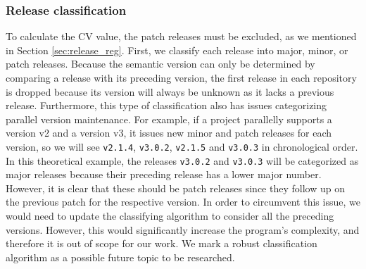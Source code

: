 \subsubsection{Release classification}

To calculate the CV value, the patch releases must be excluded, as we mentioned in Section \ref{sec:release_reg}. First, we classify each release into major, minor, or patch releases. Because the semantic version can only be determined by comparing a release with its preceding version, the first release in each repository is dropped because its version will always be unknown as it lacks a previous release. Furthermore, this type of classification also has issues categorizing parallel version maintenance. For example, if a project parallelly supports a version v2 and a version v3, it issues new minor and patch releases for each version, so we will see \texttt{v2.1.4}, \texttt{v3.0.2}, \texttt{v2.1.5} and \texttt{v3.0.3} in chronological order. In this theoretical example, the releases \texttt{v3.0.2} and \texttt{v3.0.3} will be categorized as major releases because their preceding release has a lower major number. However, it is clear that these should be patch releases since they follow up on the previous patch for the respective version. In order to circumvent this issue, we would need to update the classifying algorithm to consider all the preceding versions. However, this would significantly increase the program's complexity, and therefore it is out of scope for our work. We mark a robust classification algorithm as a possible future topic to be researched.

